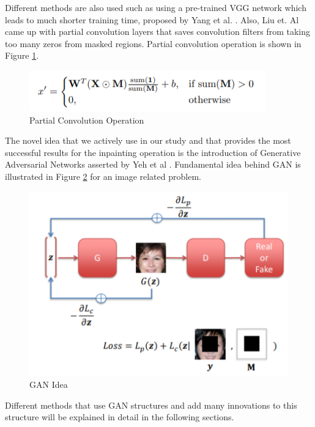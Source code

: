 Different methods are also used such as using a pre-trained VGG network which leads to much shorter training time, proposed by Yang et al. \cite{inpainting_neuralpatch}. Also, Liu et. Al \cite{richer_conv_edge} came up with partial convolution layers that saves convolution filters from taking too many zeros from masked regions. Partial convolution operation is shown in Figure \ref{fig:partial-convl}.

\begin{figure}[h]
    \centering
    \includegraphics[scale=1]{figures/chapter4/partial-conv.png}
    \caption{Partial Convolution Operation}
    \label{fig:partial-convl}
\end{figure}

The novel idea that we actively use in our study and that provides the most successful results for the inpainting operation is the introduction of Generative Adversarial Networks asserted by Yeh et al \cite{semantic_inpainting_geneative}. Fundamental idea behind GAN is illustrated in Figure \ref{fig:gan-idedal} for an image related problem.

\begin{figure}[h]
    \centering
    \includegraphics[scale=0.7]{figures/chapter4/GANinpainting.PNG}
    \caption{GAN Idea}
    \label{fig:gan-idedal}
\end{figure}

Different methods that use GAN structures and add many innovations to this structure will be explained in detail in the following sections.

